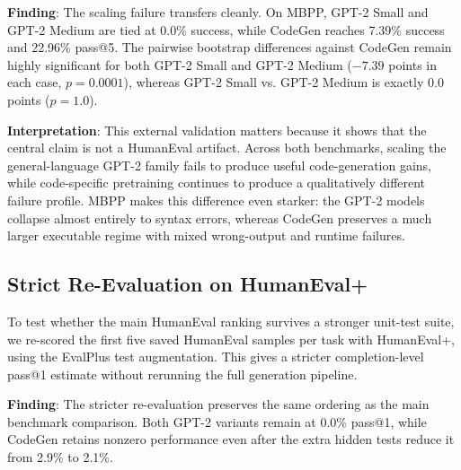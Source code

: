 \documentclass[preprint,12pt,authoryear]{elsarticle}
\begin{document}
\textbf{Finding}: The scaling failure transfers cleanly. On MBPP, GPT-2 Small and GPT-2 Medium are tied at 0.0\% success, while CodeGen reaches 7.39\% success and 22.96\% pass@5. The pairwise bootstrap differences against CodeGen remain highly significant for both GPT-2 Small and GPT-2 Medium ($-7.39$ points in each case, $p=0.0001$), whereas GPT-2 Small vs. GPT-2 Medium is exactly 0.0 points ($p=1.0$).

\textbf{Interpretation}: This external validation matters because it shows that the central claim is not a HumanEval artifact. Across both benchmarks, scaling the general-language GPT-2 family fails to produce useful code-generation gains, while code-specific pretraining continues to produce a qualitatively different failure profile. MBPP makes this difference even starker: the GPT-2 models collapse almost entirely to syntax errors, whereas CodeGen preserves a much larger executable regime with mixed wrong-output and runtime failures.

\subsection{Strict Re-Evaluation on HumanEval+}

To test whether the main HumanEval ranking survives a stronger unit-test suite, we re-scored the first five saved HumanEval samples per task with HumanEval+, using the EvalPlus test augmentation. This gives a stricter completion-level pass@1 estimate without rerunning the full generation pipeline.

\begin{table}[t]
\centering
\caption{Strict HumanEval Re-scoring with HumanEval+}
\label{tab:humaneval_plus}
\scriptsize
{}
\end{table}

\textbf{Finding}: The stricter re-evaluation preserves the same ordering as the main benchmark comparison. Both GPT-2 variants remain at 0.0\% pass@1, while CodeGen retains nonzero performance even after the extra hidden tests reduce it from 2.9\% to 2.1\%.
\end{document}
